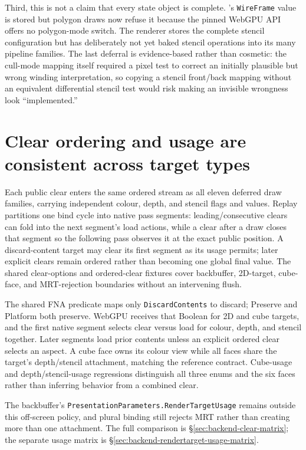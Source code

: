 Third, this is not a claim that every state object is complete. 's
\texttt{WireFrame} value is stored but polygon draws now refuse it because the pinned WebGPU API
offers no polygon-mode switch. The renderer stores the complete stencil configuration but has
deliberately not yet baked stencil operations
into its many pipeline families. The last deferral is evidence-based rather than cosmetic:
the cull-mode mapping itself required a pixel test to correct an initially plausible but wrong
winding interpretation, so copying a stencil front/back mapping without an equivalent
differential stencil test would risk making an invisible wrongness look ``implemented.''

\section{Clear ordering and usage are consistent across target types}

Each public clear enters the same ordered stream as all eleven deferred draw families, carrying
independent colour, depth, and stencil flags and values. Replay partitions one bind cycle into
native pass segments: leading/consecutive clears can fold into the next segment's load actions,
while a clear after a draw closes that segment so the following pass observes it at the exact
public position. A discard-content target may clear its first segment as its usage permits;
later explicit clears remain ordered rather than becoming one global final value. The shared
clear-options and ordered-clear fixtures cover backbuffer, 2D-target, cube-face, and MRT-rejection
boundaries without an intervening flush.

The shared FNA predicate maps only \texttt{DiscardContents} to discard; Preserve and Platform
both preserve. WebGPU receives that Boolean for 2D and cube targets, and the first native
segment selects clear versus load for colour, depth, and stencil together. Later segments load
prior contents unless an explicit ordered clear selects an aspect. A cube face owns its colour
view while all faces share the target's depth/stencil attachment, matching the reference
contract. Cube-usage and depth/stencil-usage regressions distinguish all three enums and the
six faces rather than inferring behavior from a combined clear.

The backbuffer's
\texttt{Presentation\allowbreak{}Parameters.Render\allowbreak{}Target\allowbreak{}Usage} remains
outside this off-screen policy, and plural binding still rejects MRT rather than creating more
than one attachment. The full comparison is \S\ref{sec:backend-clear-matrix}; the separate
usage matrix is \S\ref{sec:backend-rendertarget-usage-matrix}.

